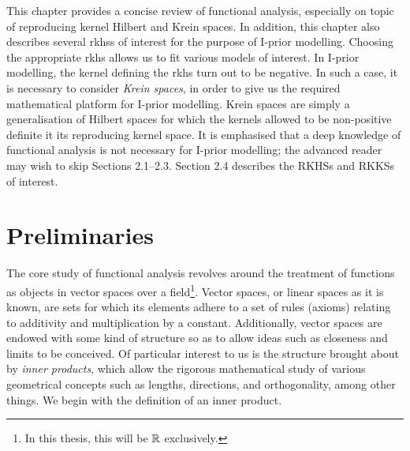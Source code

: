\documentclass[a4paper,showframe,11pt,draft]{report}
\begin{document}

This chapter provides a concise review of functional analysis, especially on topic of reproducing kernel Hilbert and Krein spaces.
In addition, this chapter also describes several \glspl{rkhs} of interest for the purpose of I-prior modelling.
Choosing the appropriate \gls{rkhs} allows us to fit various models of interest.
In I-prior modelling, the kernel defining the \gls{rkhs} turn out to be negative.
In such a case, it is necessary to consider \emph{Krein spaces}, in order to give us the required mathematical platform for I-prior modelling.
Krein spaces are simply a generalisation of Hilbert spaces for which the kernels allowed to be non-positive definite it its reproducing kernel space.
It is emphasised that a deep knowledge of functional analysis is not necessary for I-prior modelling; the advanced reader may wish to skip Sections 2.1--2.3. 
Section 2.4 describes the RKHSs and RKKSs of interest.

\section{Preliminaries}

The core study of functional analysis revolves around the treatment of functions as objects in vector spaces over a field\footnote{In this thesis, this will be $\mathbb{R}$ exclusively.}.
Vector spaces, or linear spaces as it is known, are sets for which its elements adhere to a set of rules (axioms) relating to additivity and multiplication by a constant.
Additionally, vector spaces are endowed with some kind of structure so as to allow ideas such as closeness and limits to be conceived.
Of particular interest to us is the structure brought about by \emph{inner products}, which allow the rigorous mathematical study of various geometrical concepts such as lengths, directions, and orthogonality, among other things.
We begin with the definition of an inner product. 
\end{document}
